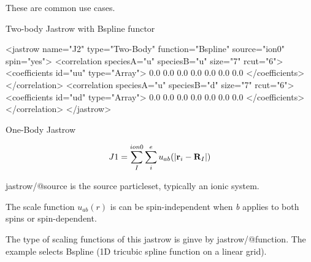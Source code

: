 These are common use cases. 
\begin{DoxyItemize}
\item Two-\/body Jastrow with {\ttfamily Bspline} functor 
\begin{DoxyCode}
<jastrow name=\textcolor{stringliteral}{"J2"} type=\textcolor{stringliteral}{"Two-Body"} \textcolor{keyword}{function}=\textcolor{stringliteral}{"Bspline"} source=\textcolor{stringliteral}{"ion0"} spin=\textcolor{stringliteral}{"yes"}>
  <correlation speciesA=\textcolor{stringliteral}{"u"} speciesB=\textcolor{stringliteral}{"u"} size=\textcolor{stringliteral}{"7"} rcut=\textcolor{stringliteral}{"6"}>
    <coefficients \textcolor{keywordtype}{id}=\textcolor{stringliteral}{"uu"} type=\textcolor{stringliteral}{"Array"}> 
    0.0 0.0 0.0 0.0 0.0 0.0 0.0
    </coefficients>
  </correlation>
  <correlation speciesA=\textcolor{stringliteral}{"u"} speciesB=\textcolor{stringliteral}{"d"} size=\textcolor{stringliteral}{"7"} rcut=\textcolor{stringliteral}{"6"}>
    <coefficients \textcolor{keywordtype}{id}=\textcolor{stringliteral}{"ud"} type=\textcolor{stringliteral}{"Array"}> 
    0.0 0.0 0.0 0.0 0.0 0.0 0.0
    </coefficients>
  </correlation>
</jastrow>
\end{DoxyCode}
  
\end{DoxyItemize}

\label{a00004_j1def}%
One-\/\-Body Jastrow

\[J1=\sum_I^{ion0}\sum_i^{e} u_{ab}(|{\bf r}_i-{\bf R}_I|)\]


\begin{DoxyItemize}
\item {\ttfamily jastrow/@source} is the source {\ttfamily particleset}, typically an ionic system. 
\item The scale function $u_{ab}(r)$ is can be spin-\/independent when {\itshape b} applies to both spins or spin-\/dependent.  
\item The type of scaling functions of this jastrow is ginve by {\ttfamily jastrow/@function}. The example selects {\ttfamily Bspline} (1\-D tricubic spline function on a linear grid).  
\end{DoxyItemize}

